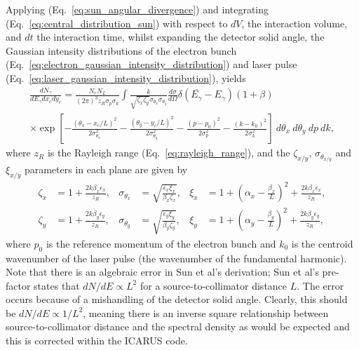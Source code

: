 \documentclass[../main.tex]{subfiles}
\begin{document}
Applying (Eq.~\ref{eq:sun_angular_divergence}) and integrating (Eq.~\ref{eq:central_distribution_sun}) with respect to $dV$, the interaction volume, and $dt$ the interaction time, whilst expanding the detector solid angle, the Gaussian intensity distributions of the electron bunch (Eq.~\ref{eq:electron_gaussian_intensity_distribution}) and laser pulse (Eq.~\ref{eq:laser_gaussian_intensity_distribution}), yields
\begin{multline}
\frac{dN_{\gamma}}{dE_{\gamma}dx_{c}dy_{c}} = \frac{N_{e}N_{L}}{\left(2\pi\right)^{3}z_{R}\sigma_{p}\sigma_{k}}\int \frac{k}{\sqrt{\zeta_{x}\zeta_{y}}\sigma_{\theta_{x}}\sigma_{\theta_{y}}}\frac{d\sigma}{d\Omega}\delta\left(\bar{E_{\gamma}}-E_{\gamma}\right)\left(1+\beta\right) \\\times\exp\left[-\frac{\left(\theta_{x}-x_{c}/L\right)^{2}}{2\sigma_{\theta_{x}}^{2}}-\frac{\left(\theta_{y}-y_{c}/L\right)^{2}}{2\sigma_{\theta_{y}}^{2}}-\frac{\left(p-p_{0}\right)^{2}}{2\sigma_{p}^{2}}-\frac{\left(k-k_{0}\right)^{2}}{2\sigma_{k}^{2}}\right]~d\theta_{x}~d\theta_{y}~dp~dk,
\label{eq:sun_volume_time_integral}    
\end{multline}
where $z_{R}$ is the Rayleigh range (Eq.~\ref{eq:rayleigh_range}), and the $\zeta_{x/y}$, $\sigma_{\theta_{x/y}}$ and $\xi_{x/y}$ parameters in each plane are given by
\begin{align}
\zeta_{x} &= 1+\frac{2k\beta_{x}\epsilon_{x}}{z_{R}}, & \sigma_{\theta_{x}} &= \sqrt{\frac{\epsilon_{x}\xi_{x}}{\beta_{x}\zeta_{x}}}, & \xi_{x} &= 1+\left(\alpha_{x}-\frac{\beta_{x}}{L}\right)^{2}+\frac{2k\beta_{x}\epsilon_{x}}{z_{R}}, \nonumber\\
\zeta_{y} &= 1+\frac{2k\beta_{y}\epsilon_{y}}{z_{R}}, & \sigma_{\theta_{y}} &= \sqrt{\frac{\epsilon_{y}\xi_{y}}{\beta_{y}\zeta_{y}}}, & \xi_{y} &= 1+\left(\alpha_{y}-\frac{\beta_{y}}{L}\right)^{2}+\frac{2k\beta_{y}\epsilon_{y}}{z_{R}}, 
\label{eq:zeta_sigmatheta_xi_parameters_sun}
\end{align}
where $p_{0}$ is the reference momentum of the electron bunch and $k_{0}$ is the centroid wavenumber of the laser pulse (the wavenumber of the fundamental harmonic). Note that there is an algebraic error in Sun et al's \cite{sun2009characterizations,sun2011theoretical} derivation; Sun et al's pre-factor states that $dN/dE\propto L^{2}$ for a source-to-collimator distance $L$. The error occurs because of a mishandling of the detector solid angle. Clearly, this should be $dN/dE\propto 1/L^{2}$, meaning there is an inverse square relationship between source-to-collimator distance and the spectral density as would be expected and this is corrected within the \textsc{ICARUS} code. 
\end{document}
